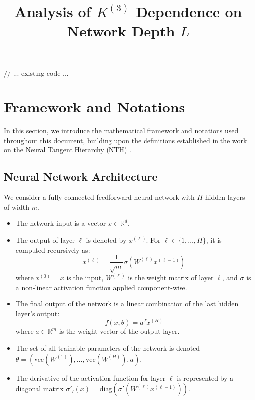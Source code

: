\documentclass[11pt,a4paper]{article}
\title{\textbf{Analysis of $K^{(3)}$ Dependence on Network Depth $L$}}
\author{}
\date{}
\begin{document}
\maketitle


\newpage


// ... existing code ...
\tableofcontents

\newpage

\section{Framework and Notations}

In this section, we introduce the mathematical framework and notations used throughout this document, building upon the definitions established in the work on the Neural Tangent Hierarchy (NTH) \cite{dyer2019asymptoticswidenetworksfeynman}.

\subsection{Neural Network Architecture}

We consider a fully-connected feedforward neural network with $H$ hidden layers of width $m$.
\begin{itemize}
    \item The network input is a vector $x \in \mathbb{R}^d$.
    \item The output of layer $\ell$ is denoted by $x^{(\ell)}$. For $\ell \in \{1, \dots, H\}$, it is computed recursively as:
    \begin{equation}
        x^{(\ell)} = \frac{1}{\sqrt{m}}\sigma(W^{(\ell)}x^{(\ell-1)})
    \end{equation}
    where $x^{(0)} = x$ is the input, $W^{(\ell)}$ is the weight matrix of layer $\ell$, and $\sigma$ is a non-linear activation function applied component-wise.
    \item The final output of the network is a linear combination of the last hidden layer's output:
    \begin{equation}
        f(x, \theta) = a^T x^{(H)}
    \end{equation}
    where $a \in \mathbb{R}^m$ is the weight vector of the output layer.
    \item The set of all trainable parameters of the network is denoted $\theta = (\text{vec}(W^{(1)}), \dots, \text{vec}(W^{(H)}), a)$.
    \item The derivative of the activation function for layer $\ell$ is represented by a diagonal matrix $\sigma'_\ell(x) = \text{diag}(\sigma'(W^{(\ell)}x^{(\ell-1)}))$.
\end{itemize}
\end{document}
